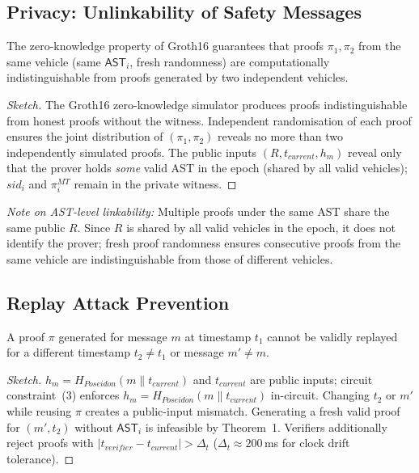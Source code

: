 \subsection{Privacy: Unlinkability of Safety Messages}

\begin{theorem}[Unlinkability]
The zero-knowledge property of Groth16 guarantees that proofs $\pi_1, \pi_2$ from
the same vehicle (same $\mathsf{AST}_i$, fresh randomness) are computationally
indistinguishable from proofs generated by two independent vehicles.
\end{theorem}
\begin{proof}[Sketch]
The Groth16 zero-knowledge simulator produces proofs indistinguishable from honest
proofs without the witness. Independent randomisation of each proof ensures the
joint distribution of $(\pi_1, \pi_2)$ reveals no more than two independently
simulated proofs. The public inputs $(R, t_{current}, h_m)$ reveal only that the
prover holds \emph{some} valid AST in the epoch (shared by all valid vehicles);
$sid_i$ and $\pi^{MT}_i$ remain in the private witness.
\end{proof}

\noindent\textit{Note on AST-level linkability:} Multiple proofs under the same AST
share the same public $R$. Since $R$ is shared by all valid vehicles in the epoch,
it does not identify the prover; fresh proof randomness ensures consecutive proofs
from the same vehicle are indistinguishable from those of different vehicles.

\subsection{Replay Attack Prevention}

\begin{theorem}
A proof $\pi$ generated for message $m$ at timestamp $t_1$ cannot be validly
replayed for a different timestamp $t_2 \neq t_1$ or message $m' \neq m$.
\end{theorem}
\begin{proof}[Sketch]
$h_m = H_{Poseidon}(m \| t_{current})$ and $t_{current}$ are public inputs; circuit
constraint~(3) enforces $h_m = H_{Poseidon}(m \| t_{current})$ in-circuit. Changing
$t_2$ or $m'$ while reusing $\pi$ creates a public-input mismatch. Generating a
fresh valid proof for $(m', t_2)$ without $\mathsf{AST}_i$ is infeasible by
Theorem~1. Verifiers additionally reject proofs with
$|t_{verifier} - t_{current}| > \Delta_t$ ($\Delta_t \approx 200$\,ms for clock
drift tolerance).
\end{proof}


